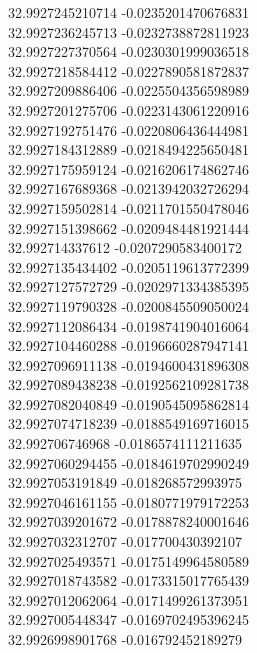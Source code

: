 {32.9927245210714	-0.0235201470676831\\
32.9927236245713	-0.0232738872811923\\
32.9927227370564	-0.0230301999036518\\
32.9927218584412	-0.0227890581872837\\
32.9927209886406	-0.0225504356598989\\
32.9927201275706	-0.0223143061220916\\
32.9927192751476	-0.0220806436444981\\
32.9927184312889	-0.0218494225650481\\
32.9927175959124	-0.0216206174862746\\
32.9927167689368	-0.0213942032726294\\
32.9927159502814	-0.0211701550478046\\
32.9927151398662	-0.0209484481921444\\
32.992714337612	-0.0207290583400172\\
32.9927135434402	-0.0205119613772399\\
32.9927127572729	-0.0202971334385395\\
32.9927119790328	-0.0200845509050024\\
32.9927112086434	-0.0198741904016064\\
32.9927104460288	-0.0196660287947141\\
32.9927096911138	-0.0194600431896308\\
32.9927089438238	-0.0192562109281738\\
32.9927082040849	-0.0190545095862814\\
32.9927074718239	-0.0188549169716015\\
32.992706746968	-0.0186574111211635\\
32.9927060294455	-0.0184619702990249\\
32.9927053191849	-0.018268572993975\\
32.9927046161155	-0.0180771979172253\\
32.9927039201672	-0.0178878240001646\\
32.9927032312707	-0.017700430392107\\
32.9927025493571	-0.0175149964580589\\
32.9927018743582	-0.0173315017765439\\
32.9927012062064	-0.0171499261373951\\
32.9927005448347	-0.0169702495396245\\
32.9926998901768	-0.016792452189279\\
}
